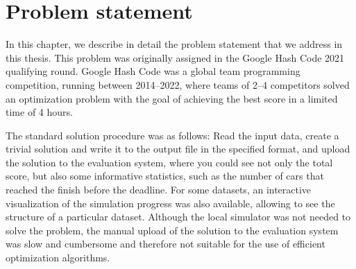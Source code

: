 \chapter{Problem statement}


In this chapter, we describe in detail the problem statement that we address in this thesis. This problem was originally assigned in the Google Hash Code \cite{google_coding_competitions} 2021 qualifying round. Google Hash Code was a global team programming competition, running between 2014--2022, where teams of 2--4 competitors solved an optimization problem with the goal of achieving the best score in a limited time of 4 hours.


The standard solution procedure was as follows: Read the input data, create a trivial solution and write it to the output file in the specified format, and upload the solution to the evaluation system, where you could see not only the total score, but also some informative statistics, such as the number of cars that reached the finish before the deadline. For some datasets, an interactive visualization of the simulation progress was also available, allowing to see the structure of a particular dataset. Although the local simulator was not needed to solve the problem, the manual upload of the solution to the evaluation system was slow and cumbersome and therefore not suitable for the use of efficient optimization algorithms.


